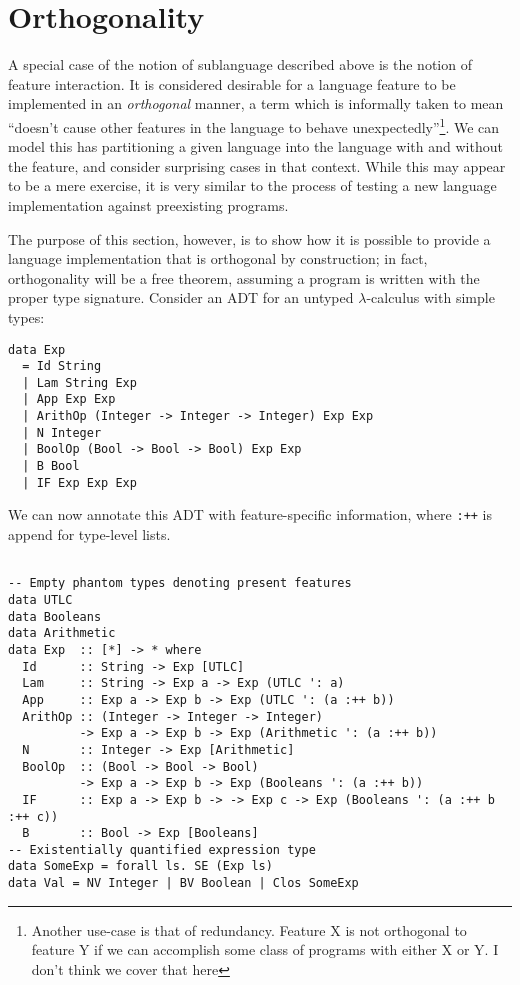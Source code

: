 \documentclass[12pt]{article}
\begin{document}
\section{Orthogonality}

A special case of the notion of sublanguage described above is the notion of
feature interaction. It is considered desirable for a language feature to be
implemented in an \emph{orthogonal} manner, a term which is informally taken to
mean ``doesn't cause other features in the language to behave
unexpectedly''\footnote{Another use-case is that of redundancy. Feature X is not
orthogonal to feature Y if we can accomplish some class of programs with either
X or Y. I don't think we cover that here}. We can model this has partitioning a
given language into the language with and without the feature, and consider
surprising cases in that context. While this may appear to be a mere exercise,
it is very similar to the process of testing a new language implementation
against preexisting programs.

The purpose of this section, however, is to show how it is possible to provide a
language implementation that is orthogonal by construction; in fact,
orthogonality will be a free theorem, assuming a program is written with the
proper type signature. Consider an ADT for an untyped $\lambda$-calculus with
simple types:

\begin{verbatim}
data Exp 
  = Id String 
  | Lam String Exp 
  | App Exp Exp 
  | ArithOp (Integer -> Integer -> Integer) Exp Exp 
  | N Integer
  | BoolOp (Bool -> Bool -> Bool) Exp Exp
  | B Bool
  | IF Exp Exp Exp
\end{verbatim}

We can now annotate this ADT with feature-specific information, where
\texttt{:++} is append for type-level lists.

\begin{verbatim}

-- Empty phantom types denoting present features
data UTLC
data Booleans
data Arithmetic
data Exp  :: [*] -> * where
  Id      :: String -> Exp [UTLC]
  Lam     :: String -> Exp a -> Exp (UTLC ': a)
  App     :: Exp a -> Exp b -> Exp (UTLC ': (a :++ b))
  ArithOp :: (Integer -> Integer -> Integer) 
          -> Exp a -> Exp b -> Exp (Arithmetic ': (a :++ b))
  N       :: Integer -> Exp [Arithmetic]
  BoolOp  :: (Bool -> Bool -> Bool) 
          -> Exp a -> Exp b -> Exp (Booleans ': (a :++ b))
  IF      :: Exp a -> Exp b -> -> Exp c -> Exp (Booleans ': (a :++ b :++ c))
  B       :: Bool -> Exp [Booleans]
-- Existentially quantified expression type
data SomeExp = forall ls. SE (Exp ls)
data Val = NV Integer | BV Boolean | Clos SomeExp 
\end{verbatim}
\end{document}
